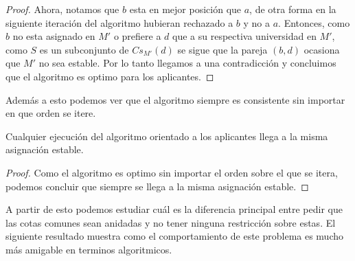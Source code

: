 \begin{proof}
Ahora, notamos que $b$ esta en mejor posición que $a$, de otra forma en la siguiente iteración del algoritmo hubieran rechazado a $b$ y no a $a$. Entonces, como $b$ no esta asignado en $M'$ o prefiere a $d$ que a su respectiva universidad en $M'$, como $S$ es un subconjunto de  $Cs_{M'}(d)$ se sigue que la pareja $(b,d)$ ocasiona que $M'$ no sea estable. Por lo tanto llegamos a una contradicción y concluimos que el algoritmo es optimo para los aplicantes. 
\end{proof}

Además a esto podemos ver que el algoritmo siempre es consistente sin importar en que orden se itere. 

\begin{cor}
Cualquier ejecución del algoritmo orientado a los aplicantes llega a la misma asignación estable. 
\end{cor}
\begin{proof}
Como el algoritmo es optimo sin importar el orden sobre el que se itera, podemos concluir que siempre se llega a la misma asignación estable.
\end{proof}

A partir de esto podemos estudiar cuál es la diferencia principal entre pedir que las cotas comunes sean anidadas y no tener ninguna restricción sobre estas. El siguiente resultado muestra como el comportamiento de este problema es mucho más amigable en terminos algoritmicos. 

